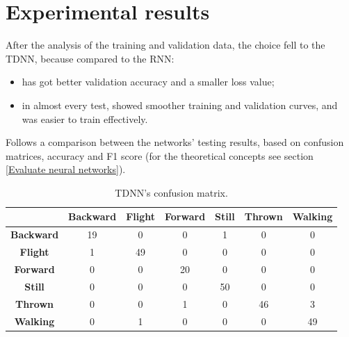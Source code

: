 \chapter{Experimental results}
After the analysis of the training and validation data, the choice fell to the TDNN, because compared to the RNN:
\begin{itemize}
	\item has got better validation accuracy and a smaller loss value;
	\item in almost every test, showed smoother training and validation curves, and was easier to train effectively.
\end{itemize}
Follows a comparison between the networks' testing results, based on confusion matrices, accuracy and F1 score (for the theoretical concepts see section \ref{Evaluate neural networks}).

\begin{table}[ht!]
	\centering
	\begin{tabular}{c|cccccc}
		& \textbf{Backward} & \textbf{Flight} & \textbf{Forward} & \textbf{Still} & \textbf{Thrown} & \textbf{Walking} \\ \hline
		\textbf{Backward} & 19                & 0               & 0                & 1              & 0               & 0                \\
		\rowcolor[HTML]{EFEFEF} 
		\textbf{Flight}   & 1                 & 49              & 0                & 0              & 0               & 0                \\
		\textbf{Forward}  & 0                 & 0               & 20               & 0              & 0               & 0                \\
		\rowcolor[HTML]{EFEFEF} 
		\textbf{Still}    & 0                 & 0               & 0                & 50             & 0               & 0                \\
		\textbf{Thrown}   & 0                 & 0               & 1                & 0              & 46              & 3                \\
		\rowcolor[HTML]{EFEFEF} 
		\textbf{Walking}  & 0                 & 1               & 0                & 0              & 0               & 49              
	\end{tabular}
	\caption{TDNN's confusion matrix.}
\end{table}

